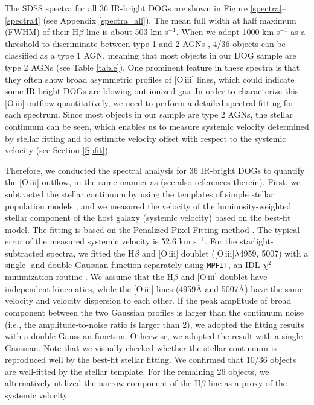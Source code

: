 \documentclass[twocolumn]{aastex6}
\newcommand{\oiii}{[O{\,\sc iii}]\,\,}
\begin{document}
   
The SDSS spectra for all 36 IR-bright DOGs are shown in Figure \ref{spectra}--\ref{spectra4} (see Appendix \ref{spectra_all}).
The mean full width at half maximum (FWHM) of their H$\beta$ line is about 503 km s$^{-1}$.
When we adopt 1000 km s$^{-1}$ as a threshold to discriminate between type 1 and 2 AGNs \citep[e.g.,][]{Yuan}, 4/36 objects can be classified as a type 1 AGN, meaning that most objects in our DOG sample are type 2 AGNs (see Table \ref{table}).
One prominent feature in these spectra is that they often show broad asymmetric profiles of \oiii lines, which could indicate some IR-bright DOGs are blowing out ionized gas.
In order to characterize this \oiii outflow quantitatively, we need to perform a detailed spectral fitting  for each spectrum.
Since most objects in our sample are type 2 AGNs, the stellar continuum can be seen, which enables us to measure systemic velocity determined by stellar fitting and to estimate velocity offset with respect to the systemic velocity (see Section \ref{Spfit}). 

Therefore, we conducted the spectral analysis for 36 IR-bright DOGs to quantify the \oiii outflow, in the same manner as \cite{Bae} (see also references therein).
First, we subtracted the stellar continuum by using the templates of simple stellar population models \citep[MILES;][]{Sanchez-Blazquez}, and we measured the velocity of the luminosity-weighted stellar component of the host galaxy (systemic velocity) based on the best-fit model.
The fitting is based on the Penalized Pixel-Fitting method \citep[{\tt pPXF};][]{Cappellari}.
The typical error of the measured systemic velocity is 52.6 km s$^{-1}$.
For the starlight-subtracted spectra, we fitted the H$\beta$ and \oiii doublet ([O{\,\sc iii}]$\lambda$4959, 5007) with a single- and double-Gaussian function separately using {\tt MPFIT}, an IDL $\chi^2$-minimization routine \citep{Markwardt}. 
We assume that the H$\beta$ and \oiii doublet have independent kinematics, while the \oiii lines (4959\AA \,\,and 5007\AA) have the same velocity and velocity dispersion to each other. 
If the peak amplitude of broad component between the two Gaussian profiles is larger than the continuum noise (i.e., the amplitude-to-noise ratio is larger than 2), we adopted the fitting results with a double-Gaussian function. 
Otherwise, we adopted the result with a single Gaussian.
Note that we visually checked whether the stellar continuum is reproduced well by the best-fit stellar fitting.
We confirmed that 10/36 objects are well-fitted by the stellar template.
For the remaining 26 objects, we alternatively utilized the narrow component of the H$\beta$ line as a proxy of the systemic velocity.  \\
\end{document}
